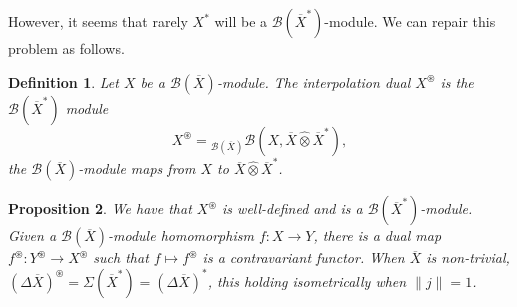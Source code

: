 \documentclass[a4paper,11pt]{article}
\theoremstyle{plain}
\newtheorem{proposition}{Proposition}[section]
\newtheorem{definition}[proposition]{Definition}
\theoremstyle{remark}
\newcommand{\mc}[1]{\mathcal{#1}}
\newcommand{\proten}{\widehat\otimes}
\newcommand{\intdual}{\circledast}
\begin{document}
However, it seems that rarely $X^*$ will be a $\mc B(\overline X^*)$-module.  We can repair this problem as follows.

\begin{definition}
Let $X$ be a $\mc B(\overline X)$-module.  The \emph{interpolation dual} $X^\intdual$ is the $\mc B(\overline X^*)$ module
\[ X^\intdual = {}_{\mc B(\overline X)}\mc B(X, \overline X \proten \overline X^*), \]
the $\mc B(\overline X)$-module maps from $X$ to $\overline X \proten \overline X^*$.
\end{definition}

\begin{proposition}
We have that $X^\intdual$ is well-defined and is a $\mc B(\overline X^*)$-module.  Given a $\mc B(\overline X)$-module homomorphism $f \colon X \to Y$, there is a dual map $f^\intdual \colon Y^\intdual \to X^\intdual$ such that $f\mapsto f^\intdual$ is a contravariant functor.  When $\overline X$ is non-trivial, $(\Delta\overline X)^\intdual = \Sigma(\overline X^*) = (\Delta\overline X)^*$, this holding isometrically when $\|j\|=1$.
\end{proposition}
\end{document}
